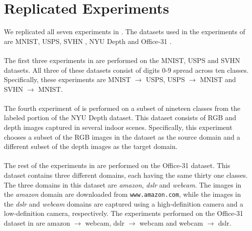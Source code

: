 \documentclass[14pt]{extarticle}
\begin{document}
		\section{Replicated Experiments}
		We replicated all seven experiments in \cite{adda}. The datasets used in the experiments of \cite{adda} are MNIST, USPS, SVHN \cite{svhn}, NYU Depth \cite{nyud2} and Office-31 \cite{office31}.\\\\
		The first three experiments in \cite{adda} are performed on the MNIST, USPS and SVHN datasets. All three of these datasets consist of digits 0-9 spread across ten classes. Specifically, these experiments are MNIST $\rightarrow$ USPS, USPS $\rightarrow$ MNIST and SVHN $\rightarrow$ MNIST.\\\\
		The fourth experiment of \cite{adda} is performed on a subset of nineteen classes from the labeled portion of the NYU Depth dataset. This dataset consists of RGB and depth images captured in several indoor scenes. Specifically, this experiment chooses a subset of the RGB images in the dataset as the source domain and a different subset of the depth images as the target domain.\\\\
		The rest of the experiments in \cite{adda} are performed on the Office-31 dataset. This dataset contains three different domains, each having the same thirty one classes. The three domains in this dataset are \textit{amazon}, \textit{dslr} and \textit{webcam}. The images in the \textit{amazon} domain are downloaded from \texttt{www.amazon.com}, while the images in the \textit{dslr} and \textit{webcam} domains are captured using a high-definition camera and a low-definition camera, respectively. The experiments performed on the Office-31 dataset in \cite{adda} are amazon $\rightarrow$ webcam, dslr $\rightarrow$ webcam and webcam $\rightarrow$ dslr.
	
	
\end{document}
